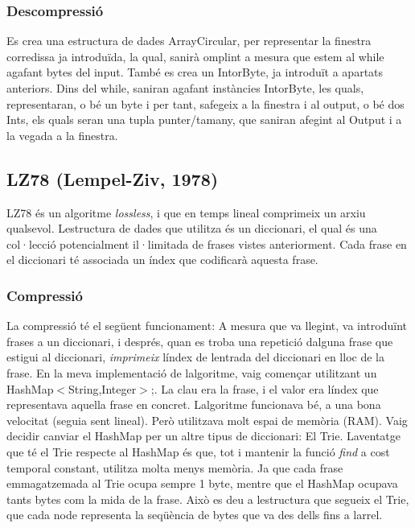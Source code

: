 \subsubsection*{Descompressió}

Es crea una estructura de dades Array\+Circular, per representar la finestra corredissa ja introduïda, la qual, s\textquotesingle{}anirà omplint a mesura que estem al while agafant byte\textquotesingle{}s del input. També es crea un Intor\+Byte, ja introduït a apartats anteriors. Dins del while, s\textquotesingle{}aniran agafant instàncies Intor\+Byte, les quals, representaran, o bé un byte i per tant, s\textquotesingle{}afegeix a la finestra i al output, o bé dos Int\textquotesingle{}s, els quals seran una tupla punter/tamany, que s\textquotesingle{}aniran afegint al Output i a la vegada a la finestra.

\subsection*{L\+Z78 (Lempel-\/\+Ziv, 1978)}

L\+Z78 és un algoritme {\itshape lossless}, i que en temps lineal comprimeix un arxiu qualsevol. L\textquotesingle{}estructura de dades que utilitza és un diccionari, el qual és una col·lecció potencialment il·limitada de frases vistes anteriorment. Cada frase en el diccionari té associada un índex que codificarà aquesta frase.

\subsubsection*{Compressió}

La compressió té el següent funcionament\+: A mesura que va llegint, va introduïnt frases a un diccionari, i després, quan es troba una repetició d\textquotesingle{}alguna frase que estigui al diccionari, {\itshape imprimeix} l\textquotesingle{}índex de l\textquotesingle{}entrada del diccionari en lloc de la frase. En la meva implementació de l\textquotesingle{}algoritme, vaig començar utilitzant un Hash\+Map$<$\+String,\+Integer$>$;. La clau era la frase, i el valor era l\textquotesingle{}índex que representava aquella frase en concret. L\textquotesingle{}algoritme funcionava bé, a una bona velocitat (seguia sent lineal). Però utilitzava molt espai de memòria (R\+AM). Vaig decidir canviar el Hash\+Map per un altre tipus de diccionari\+: El Trie. L\textquotesingle{}aventatge que té el Trie respecte al Hash\+Map és que, tot i mantenir la funció {\itshape find} a cost temporal constant, utilitza molta menys memòria. Ja que cada frase emmagatzemada al Trie ocupa sempre 1 byte, mentre que el Hash\+Map ocupava tants bytes com la mida de la frase. Això es deu a l\textquotesingle{}estructura que segueix el Trie, que cada node representa la seqüència de bytes que va des d\textquotesingle{}ells fins a l\textquotesingle{}arrel.

